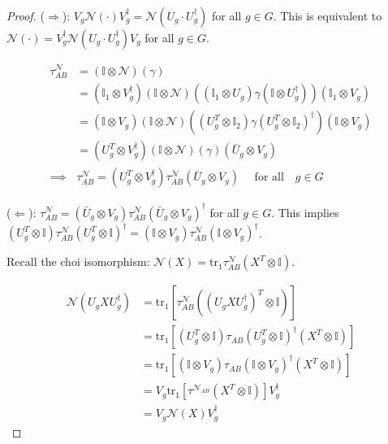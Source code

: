 \documentclass[10pt,oneside,longbibliography]{report}
\begin{document}
\begin{proof}
($\Rightarrow$): $V_g \mathcal{N} (\cdot) V_g^{\dagger} = \mathcal{N}(U_g \cdot U_g^{\dagger})$ for all $g\in G$. This is equivalent to $\mathcal{N}(\cdot) = V^{\dagger}_g \mathcal{N}(U_g \cdot U^{\dagger}_g)V_g$ for all $g\in G$.

\begin{align}
    \tau^{\mathcal{N}}_{AB} &= (\mathbb{I} \otimes \mathcal{N})(\gamma)\\
    &= (\mathbb{I}_1 \otimes V_{g}^{\dagger})(\mathbb{I} \otimes \mathcal{N})\left((\mathbb{I}_1 \otimes U_g)\gamma(\mathbb{I} \otimes U^{\dagger}_g)\right)(\mathbb{I}_1 \otimes V_g) \\
    &= (\mathbb{I} \otimes V_g)(\mathbb{I} \otimes \mathcal{N}) \left( (U_g^{T} \otimes \mathbb{I}_2) \gamma (U^T_g \otimes \mathbb{I}_2)^{\dagger} \right)(\mathbb{I} \otimes V_g) \\
    &= (U^T_g \otimes V^{\dagger}_g)(\mathbb{I}\otimes \mathcal{N})(\gamma)(\bar{U}_g \otimes V_g)\\
    \implies & \tau^{\mathcal{N}}_{AB}= (U^T_g \otimes V^{\dagger}_g) \tau^{\mathcal{N}}_{AB} (\bar{U}_g \otimes V_g) \quad \text{ for all} \quad g \in G
\end{align}

($\Leftarrow$): $\tau^{\mathcal{N}}_{AB} = (\bar{U}_g \otimes V_g) \tau^{\mathcal{N}}_{AB} (\bar{U}_g \otimes V_g)^{\dagger}$ for all $g\in G$. This implies $(U_g^T \otimes \mathbb{I}) \tau^{\mathcal{N}}_{AB} (U_g^T \otimes \mathbb{I})^{\dagger} = (\mathbb{I}\otimes V_g)\tau^{\mathcal{N}}_{AB}(\mathbb{I} \otimes V_g)^{\dagger}$.


\noindent Recall the choi isomorphism: $\mathcal{N}(X) = \text{tr}_1 \tau^{\mathcal{N}}_{AB} (X^T \otimes \mathbb{I})$.

\begin{align}
    \mathcal{N}(U_g X U_g^{\dagger})&=\text{tr}_1 \left[\tau^{\mathcal{N}}_{AB}((U_g X U_g^{\dagger})^T \otimes \mathbb{I})\right]\\
    &= \text{tr}_1 \left[(U_g^T \otimes \mathbb{I})\tau_{AB} (U_g^T \otimes \mathbb{I})^{\dagger}(X^T \otimes \mathbb{I})\right]\\
    &= \text{tr}_1 \left[(\mathbb{I}\otimes V_g)\tau_{AB} (\mathbb{I} \otimes V_g)^{\dagger} (X^T \otimes \mathbb{I})\right]\\
    &=V_g \text{tr}_1 \left[\tau^{\mathcal{N}_{AB}} (X^T \otimes \mathbb{I}) \right]V_g^{\dagger}\\
    &= V_g \mathcal{N}(X)V_g^{\dagger}
\end{align}
\end{proof}
\end{document}
